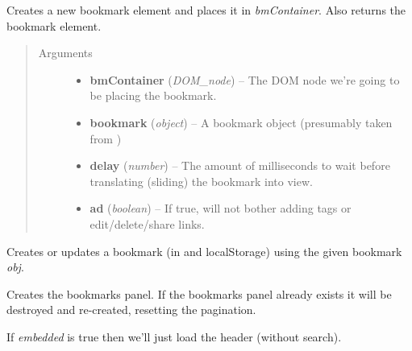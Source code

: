 \documentclass[letterpaper,10pt,openany]{sphinxmanual}
\begin{document}
\begin{fulllineitems}
\label{Applications/terminal/plugin_bookmarks:GateOne.Bookmarks.createBookmark}
Creates a new bookmark element and places it in \emph{bmContainer}.  Also returns the bookmark element.
\begin{quote}\begin{description}
\item[{Arguments}] \leavevmode\begin{itemize}
\item {} 
\textbf{bmContainer} (\emph{DOM\_node}) -- The DOM node we're going to be placing the bookmark.

\item {} 
\textbf{bookmark} (\emph{object}) -- A bookmark object (presumably taken from {\hyperref[Applications/terminal/plugin_bookmarks:GateOne.Bookmarks.bookmarks]{}})

\item {} 
\textbf{delay} (\emph{number}) -- The amount of milliseconds to wait before translating (sliding) the bookmark into view.

\item {} 
\textbf{ad} (\emph{boolean}) -- If true, will not bother adding tags or edit/delete/share links.

\end{itemize}

\end{description}\end{quote}

\end{fulllineitems}


\begin{fulllineitems}
\label{Applications/terminal/plugin_bookmarks:GateOne.Bookmarks.createOrUpdateBookmark}
Creates or updates a bookmark (in  and localStorage) using the given bookmark \emph{obj}.

\end{fulllineitems}


\begin{fulllineitems}
\label{Applications/terminal/plugin_bookmarks:GateOne.Bookmarks.createPanel}
Creates the bookmarks panel.  If the bookmarks panel already exists it will be destroyed and re-created, resetting the pagination.

If \emph{embedded} is true then we'll just load the header (without search).

\end{fulllineitems}
\end{document}
